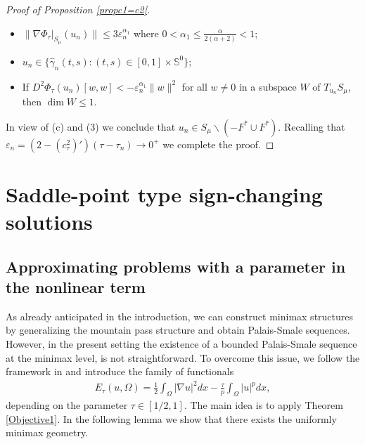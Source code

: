 \documentclass[10pt,a4paper]{article}
\theoremstyle{definition} \theoremstyle{remark}
\numberwithin{equation}{section}
\newcommand{\s}{\mathbb{S}}
\begin{document}
\begin{proof}[Proof of Proposition \ref{propc1=c2}]
\begin{itemize}
     	\item[(2)] $\|\nabla \Phi_\tau|_{S_\mu}(u_n)\| \leq 3\varepsilon_n^{\alpha_1}$ where $ 0 < \alpha_1 \le \frac{\alpha}{2(\alpha+2)} < 1$;
     	\item[(3)] $u_n \in \bigl\{\hat \gamma_n(t,s): (t,s) \in [0,1] \times \s^0\bigr\}$;
     	\item[(4)] If $D^2\Phi_\tau(u_n)[w, w] < -\varepsilon_n^{\alpha_1}\|w\|^2$ for all $w \neq 0$ in a subspace $W$ of $T_{u_n}S_\mu$, then
     	$\dim W \le 1$.
     \end{itemize}
     In view of (c) and (3) we conclude that $u_n \in S_\mu \backslash (-F^* \cup F^*)$. Recalling that $\varepsilon_n = (2-(c_\tau^2)')(\tau - \tau_n) \to 0^+$ we complete the proof.
\end{proof}


\section{Saddle-point type sign-changing solutions} \label{secappropro}

\subsection{Approximating problems with a parameter in the nonlinear term}

As already anticipated in the introduction, we can construct minimax structures by generalizing the mountain pass structure and obtain Palais-Smale sequences. However, in the present setting the existence of a bounded Palais-Smale sequence at the minimax level, is not straightforward. To overcome this issue, we follow the framework in \cite{BCJN} and introduce the family of functionals
\begin{align*}
	E_\tau(u,\Omega) = \frac12\int_\Omega|\nabla u|^2dx - \frac \tau p\int_\Omega|u|^pdx,
\end{align*}
depending on the parameter $\tau \in [1/2,1]$. The main idea is to apply Theorem \ref{Objective1}. In the following lemma we show that there exists the uniformly minimax geometry.
\end{document}
